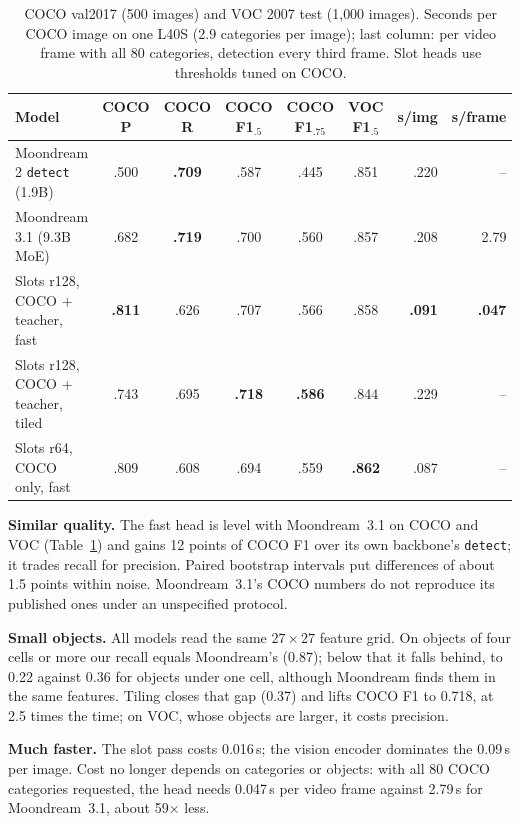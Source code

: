\documentclass[10pt,twocolumn]{article}
\begin{document}
\begin{table}[t]
\centering\small\setlength{\tabcolsep}{4pt}
\caption{COCO val2017 (500 images) and VOC 2007 test (1{,}000 images). Seconds per
COCO image on one L40S (2.9 categories per image); last column: per video frame with all
80 categories, detection every third frame. Slot heads use thresholds tuned on COCO.}
\label{tab:main}
\begin{tabular}{@{}lcccccrr@{}}
\toprule
Model & COCO P & COCO R & COCO F1$_{.5}$ & COCO F1$_{.75}$ & VOC F1$_{.5}$ & s/img & s/frame \\
\midrule
Moondream 2 \texttt{detect} (1.9B) & .500 & \textbf{.709} & .587 & .445 & .851 & .220 & -- \\
Moondream 3.1 (9.3B MoE) & .682 & \textbf{.719} & .700 & .560 & .857 & .208 & 2.79 \\
\midrule
Slots r128, COCO + teacher, fast & \textbf{.811} & .626 & .707 & .566 & .858 & \textbf{.091} & \textbf{.047} \\
Slots r128, COCO + teacher, tiled & .743 & .695 & \textbf{.718} & \textbf{.586} & .844 & .229 & -- \\
Slots r64, COCO only, fast & .809 & .608 & .694 & .559 & \textbf{.862} & .087 & -- \\
\bottomrule
\end{tabular}
\end{table}

\textbf{Similar quality.} The fast head is level with Moondream~3.1 on COCO and VOC
(Table~\ref{tab:main}) and gains 12 points of COCO F1 over its own backbone's
\texttt{detect}; it trades recall for precision. Paired bootstrap intervals put
differences of about 1.5 points within noise. Moondream~3.1's COCO numbers do not
reproduce its published ones under an unspecified protocol.

\textbf{Small objects.} All models read the same $27\times27$ feature grid. On objects
of four cells or more our recall equals Moondream's (0.87); below that it falls behind,
to 0.22 against 0.36 for objects under one cell, although Moondream finds them in the
same features. Tiling closes that gap (0.37) and lifts COCO F1 to 0.718, at 2.5 times the
time; on VOC, whose objects are larger, it costs precision.

\textbf{Much faster.} The slot pass costs 0.016\,s; the vision encoder dominates the
0.09\,s per image. Cost no longer depends on categories or objects: with all 80 COCO
categories requested, the head needs 0.047\,s per video frame against 2.79\,s for
Moondream~3.1, about 59$\times$ less.
\end{document}
